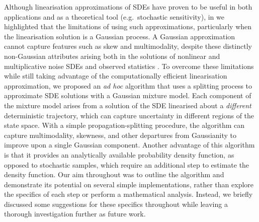 Although linearisation approximations of SDEs have proven to be useful in both applications and as a theoretical tool (e.g.\ stochastic sensitivity), in  we highlighted that the limitations of using such approximations, particularly when the linearisation solution is a Gaussian process.
A Gaussian approximation cannot capture features such as skew and multimodality, despite these distinctly non-Gaussian attributes arising both in the solutions of nonlinear and multiplicative noise SDEs and observed statistics \citep{SuraEtAl_2005_MultiplicativeNoiseNonGaussianity,del-Castillo-Negrete_1998_AsymmetricTransportNonGaussian,BraccoEtAl_2000_VelocityProbabilityDensity}.
To overcome these limitations while still taking advantage of the computationally efficient linearisation approximation, we proposed an \emph{ad hoc} algorithm that uses a splitting process to approximate SDE solutions with a Gaussian mixture model.
Each component of the mixture model arises from a solution of the SDE linearised about a \emph{different} deterministic trajectory, which can capture uncertainty in different regions of the state space.
With a simple propagation-splitting procedure, the algorithm can capture multimodality, skewness, and other departures from Gaussianity to improve upon a single Gaussian component.
Another advantage of this algorithm is that it provides an analytically available probability density function, as opposed to stochastic samples, which require an additional step to estimate the density function.
Our aim throughout was to outline the algorithm and demonstrate its potential on several simple implementations, rather than explore the specifics of each step or perform a mathematical analysis.
Instead, we briefly discussed some suggestions for these specifics throughout  while leaving a thorough investigation further as future work.

